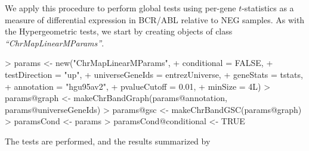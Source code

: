 \documentclass[11pt]{article}
\newcommand{\Rclass}[1]{\textit{``#1''}}
\begin{document}
We apply this procedure to perform global tests using per-gene
$t$-statistics as a measure of differential expression in BCR/ABL
relative to NEG samples.  As with the Hypergeometric tests, we start
by creating objects of class \Rclass{ChrMapLinearMParams}.
%
\begin{Schunk}
\begin{Sinput}
> params <- new("ChrMapLinearMParams",
+               conditional = FALSE,
+               testDirection = "up",
+               universeGeneIds = entrezUniverse,
+               geneStats = tstats,
+               annotation = "hgu95av2",
+               pvalueCutoff = 0.01, 
+               minSize = 4L)
> params@graph <- makeChrBandGraph(params@annotation, params@universeGeneIds)
> params@gsc <- makeChrBandGSC(params@graph)
> paramsCond <- params
> paramsCond@conditional <- TRUE
\end{Sinput}
\end{Schunk}
The tests are performed, and the results summarized by
\end{document}
